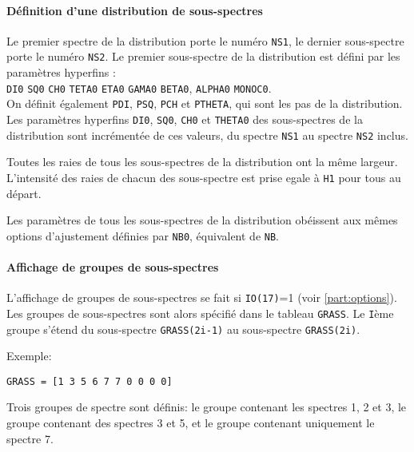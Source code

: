 \paragraph{Définition d'une distribution de sous-spectres}
Le premier spectre de la distribution porte le numéro \lstinline{NS1}, le dernier sous-spectre porte le numéro \lstinline{NS2}.
Le premier sous-spectre de la distribution  est défini par les paramètres hyperfins : \\

\lstinline{DI0} \lstinline{SQ0} \lstinline{CH0} \lstinline{TETA0} \lstinline{ETA0} \lstinline{GAMA0} \lstinline{BETA0}, \lstinline{ALPHA0} \lstinline{MONOC0}. \\

On définit également \lstinline{PDI}, \lstinline{PSQ}, \lstinline{PCH} et \lstinline{PTHETA}, qui sont les pas de la distribution.
Les paramètres hyperfins \lstinline{DI0}, \lstinline{SQ0}, \lstinline{CH0} et \lstinline{THETA0} des sous-spectres de la distribution  sont incrémentée de ces valeurs, du spectre \lstinline{NS1} au spectre \lstinline{NS2} inclus.

Toutes les raies de tous les sous-spectres de la distribution ont la même largeur.
 L'intensité des raies de chacun des sous-spectre est prise egale à \lstinline{H1} pour tous au départ.

Les paramètres de tous les sous-spectres de la distribution obéissent aux mêmes options d'ajustement définies par \lstinline{NB0}, équivalent de \lstinline{NB}.

\paragraph{Affichage de groupes de sous-spectres}
L'affichage de groupes de sous-spectres se fait si  \lstinline{IO(17)}=1 (voir \ref{part:options}). 
Les groupes de sous-spectres sont alors spécifié dans le tableau \lstinline{GRASS}. 
Le \lstinline{I}ème groupe s'étend du sous-spectre \lstinline{GRASS(2i-1)} au sous-spectre \lstinline{GRASS(2i)}.

Exemple: 

\lstinline{GRASS = [1 3 5 6 7 7 0 0 0 0]}

Trois groupes de spectre sont définis: le groupe contenant les spectres 1, 2 et 3, le groupe contenant des spectres 3 et 5, et le groupe contenant uniquement le spectre 7. 


\FloatBarrier
